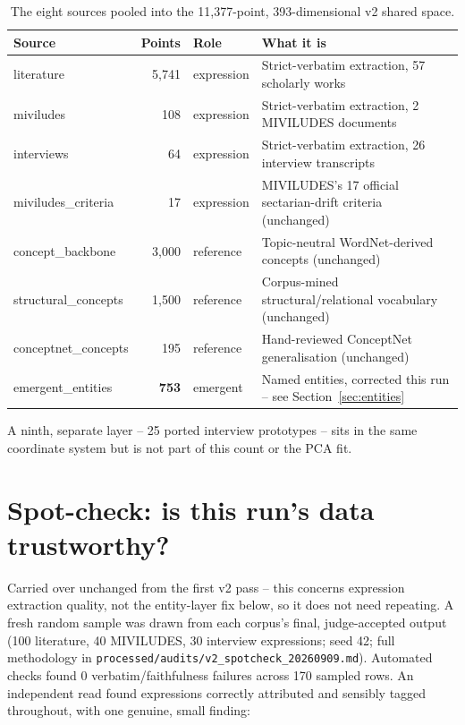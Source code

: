\documentclass[11pt,a4paper]{article}
\begin{document}
\begin{table}[h!]
\centering
\small
\begin{tabularx}{\textwidth}{@{}l r l X@{}}
\toprule
\textbf{Source} & \textbf{Points} & \textbf{Role} & \textbf{What it is} \\
\midrule
literature & 5{,}741 & expression & Strict-verbatim extraction, 57 scholarly works \\
miviludes & 108 & expression & Strict-verbatim extraction, 2 MIVILUDES documents \\
interviews & 64 & expression & Strict-verbatim extraction, 26 interview transcripts \\
miviludes\_criteria & 17 & expression & MIVILUDES's 17 official sectarian-drift criteria (unchanged) \\
concept\_backbone & 3{,}000 & reference & Topic-neutral WordNet-derived concepts (unchanged) \\
structural\_concepts & 1{,}500 & reference & Corpus-mined structural/relational vocabulary (unchanged) \\
conceptnet\_concepts & 195 & reference & Hand-reviewed ConceptNet generalisation (unchanged) \\
emergent\_entities & \textbf{753} & emergent & Named entities, corrected this run -- see Section~\ref{sec:entities} \\
\bottomrule
\end{tabularx}
\caption{The eight sources pooled into the 11{,}377-point, 393-dimensional v2 shared space.}
\end{table}

A ninth, separate layer -- 25 ported interview prototypes -- sits in the
same coordinate system but is not part of this count or the PCA fit.

\section{Spot-check: is this run's data trustworthy?}
\label{sec:spotcheck}

Carried over unchanged from the first v2 pass -- this concerns expression
extraction quality, not the entity-layer fix below, so it does not need
repeating. A fresh random sample was drawn from each corpus's final,
judge-accepted output (100 literature, 40 MIVILUDES, 30 interview
expressions; seed 42; full methodology in
\texttt{processed/audits/v2\_spotcheck\_20260909.md}). Automated checks
found 0 verbatim/faithfulness failures across 170 sampled rows. An
independent read found expressions correctly attributed and sensibly
tagged throughout, with one genuine, small finding:
\end{document}
